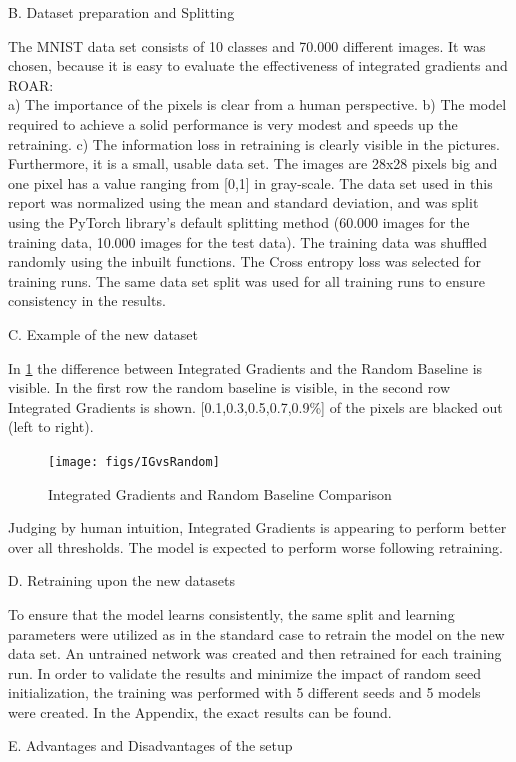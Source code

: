 B. Dataset preparation and Splitting

The MNIST data set consists of 10 classes and 70.000 different images. It was chosen, because it is easy to evaluate the effectiveness of integrated gradients and ROAR:\\ a) The importance of the pixels is clear from a human perspective. b) The model required to achieve a solid performance is very modest and speeds up the retraining. c) The information loss in retraining is clearly visible in the pictures. Furthermore, it is a small, usable data set. The images are 28x28 pixels big and one pixel has a value ranging from [0,1] in gray-scale. The data set used in this report was normalized using the mean and standard deviation, and was split using the PyTorch library’s default splitting method (60.000 images for the training data, 10.000 images for the test data). The training data was shuffled randomly using the inbuilt functions. The Cross entropy loss was selected for training runs. The same data set split was used for all training runs to ensure consistency in the results.

C. Example of the new dataset

In \ref{fig:IGvsRandom} the difference between Integrated Gradients and the Random Baseline is visible. In the first row the random baseline is visible, in the second row Integrated Gradients is shown. [0.1,0.3,0.5,0.7,0.9\%] of the pixels are blacked out (left to right).

\begin{figure}[h!]
	\centering
	\texttt{[image: figs/IGvsRandom]}
	\caption{Integrated Gradients and Random Baseline Comparison}
	\label{fig:IGvsRandom}
\end{figure}

Judging by human intuition, Integrated Gradients is appearing to perform better over all thresholds. The model is expected to perform worse following retraining.

D. Retraining upon the new datasets

To ensure that the model learns consistently, the same split and learning parameters were utilized as in the standard case to retrain the model on the new data set. An untrained network was created and then retrained for each training run. In order to validate the results and minimize the impact of random seed initialization, the training was performed with 5 different seeds and 5 models were created. In the Appendix, the exact results can be found.

E. Advantages and Disadvantages of the setup

